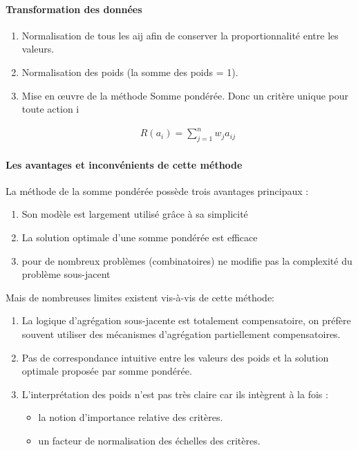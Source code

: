 \paragraph{Transformation des données}
\begin{enumerate}
\item Normalisation de tous les aij afin de conserver la proportionnalité entre les valeurs.
\item Normalisation des poids (la somme des poids = 1).
\item Mise en œuvre de la méthode Somme pondérée. 
Donc un critère unique pour toute action i
 
\begin{align*}
R(a_{i}) = \sum_{j=1}^{n}w_{j}a_{ij}
\end{align*}
\end{enumerate}
	

\paragraph{Les avantages et inconvénients de cette méthode}
La méthode de la somme pondérée possède trois avantages principaux :
\begin{enumerate}
\item Son modèle est largement utilisé grâce à sa simplicité 
\item La solution optimale d'une somme pondérée est efficace
\item pour de nombreux problèmes (combinatoires) ne modifie pas la complexité du problème  sous-jacent
\end{enumerate}
\newpage
Mais de nombreuses limites existent vis-à-vis de cette méthode:
\begin{enumerate}
\item La logique d’agrégation sous-jacente est totalement compensatoire, on préfère souvent utiliser des mécanismes d’agrégation partiellement compensatoires.
\item Pas de correspondance intuitive entre les valeurs des poids et la solution optimale proposée par somme pondérée.
\item L’interprétation des poids n’est pas très claire car ils intègrent à la fois :
\begin{itemize}
\item la notion d’importance relative des critères. 
\item un facteur de normalisation des échelles des critères. 
\end{itemize}
\end{enumerate}

